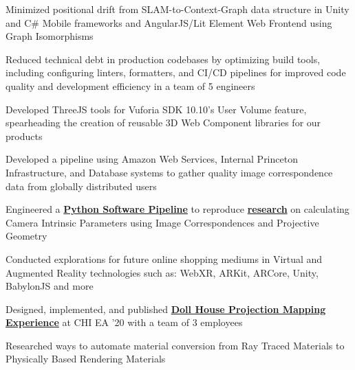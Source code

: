 \documentclass[]{plushcv}
\begin{document}
\begin{minipage}[t]{0.70\textwidth}
    \begin{tightemize}
        \item Minimized positional drift from SLAM-to-Context-Graph data structure in Unity and C\# Mobile frameworks and AngularJS/Lit Element Web Frontend using Graph Isomorphisms
        \item Reduced technical debt in production codebases by optimizing build tools, including configuring linters, formatters, and CI/CD pipelines for improved code quality and development efficiency in a team of 5 engineers              
        \item Developed ThreeJS tools for Vuforia SDK 10.10's User Volume feature, spearheading the creation of reusable 3D Web Component libraries for our products
    \end{tightemize}
    \sectionsep

    \begin{tightemize}
        \sectionsep
        \item Developed a pipeline using Amazon Web Services, Internal Princeton Infrastructure, and Database systems to gather quality
        image correspondence data from globally distributed users
        \item Engineered a
        \textbf{\href{https://github.com/johanos/pollefeys-self-calibration-and-metric-reconstruction}{Python Software Pipeline}}
        to reproduce 
        \textbf{\href{https://people.inf.ethz.ch/pomarc/pubs/PollefeysIJCV99.pdf}{research}}
        on calculating Camera Intrinsic Parameters using Image Correspondences and Projective Geometry
    \end{tightemize}
    \sectionsep

    \begin{tightemize}
        \sectionsep
        \item Conducted explorations for future online shopping mediums in Virtual and Augmented Reality technologies such as: WebXR, ARKit, ARCore, Unity, BabylonJS and more
        \item Designed, implemented, and published \textbf{\href{https://dl.acm.org/doi/10.1145/3334480.3383180}{Doll House Projection Mapping Experience}} at CHI EA '20 with a team of 3 employees
        \item Researched ways to automate material conversion from Ray Traced Materials to Physically Based Rendering Materials
    \end{tightemize}
    \sectionsep


\end{minipage}
\end{document}

